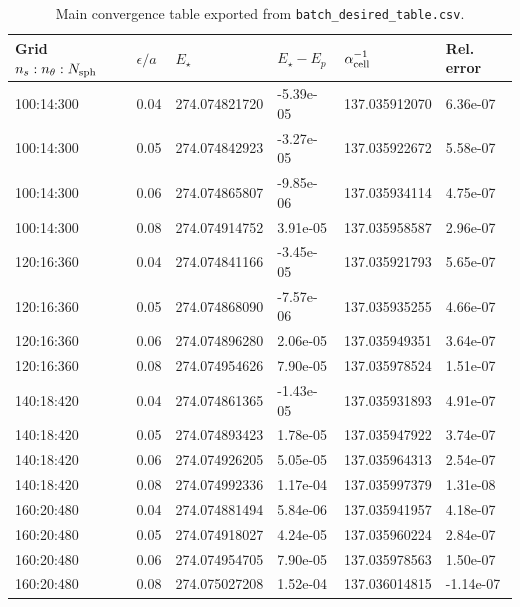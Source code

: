 \documentclass[11pt]{article}
\begin{document}
\begin{table}[p]
\centering
\caption{Main convergence table exported from \texttt{batch\_desired\_table.csv}.}
\small
\begin{tabular}{@{}llllll@{}}
\toprule
Grid $n_s:n_\theta:N_{\rm sph}$ & $\epsilon/a$ & $E_\star$ & $E_\star-E_p$ & $\alpha_{\rm cell}^{-1}$ & Rel. error \\
\midrule
100:14:300 & 0.04 & 274.074821720 & -5.39e-05 & 137.035912070 & 6.36e-07 \\
100:14:300 & 0.05 & 274.074842923 & -3.27e-05 & 137.035922672 & 5.58e-07 \\
100:14:300 & 0.06 & 274.074865807 & -9.85e-06 & 137.035934114 & 4.75e-07 \\
100:14:300 & 0.08 & 274.074914752 & 3.91e-05 & 137.035958587 & 2.96e-07 \\
120:16:360 & 0.04 & 274.074841166 & -3.45e-05 & 137.035921793 & 5.65e-07 \\
120:16:360 & 0.05 & 274.074868090 & -7.57e-06 & 137.035935255 & 4.66e-07 \\
120:16:360 & 0.06 & 274.074896280 & 2.06e-05 & 137.035949351 & 3.64e-07 \\
120:16:360 & 0.08 & 274.074954626 & 7.90e-05 & 137.035978524 & 1.51e-07 \\
140:18:420 & 0.04 & 274.074861365 & -1.43e-05 & 137.035931893 & 4.91e-07 \\
140:18:420 & 0.05 & 274.074893423 & 1.78e-05 & 137.035947922 & 3.74e-07 \\
140:18:420 & 0.06 & 274.074926205 & 5.05e-05 & 137.035964313 & 2.54e-07 \\
140:18:420 & 0.08 & 274.074992336 & 1.17e-04 & 137.035997379 & 1.31e-08 \\
160:20:480 & 0.04 & 274.074881494 & 5.84e-06 & 137.035941957 & 4.18e-07 \\
160:20:480 & 0.05 & 274.074918027 & 4.24e-05 & 137.035960224 & 2.84e-07 \\
160:20:480 & 0.06 & 274.074954705 & 7.90e-05 & 137.035978563 & 1.50e-07 \\
160:20:480 & 0.08 & 274.075027208 & 1.52e-04 & 137.036014815 & -1.14e-07 \\
\bottomrule
\end{tabular}
\label{tab:fullbatch}
\end{table}
\end{document}
